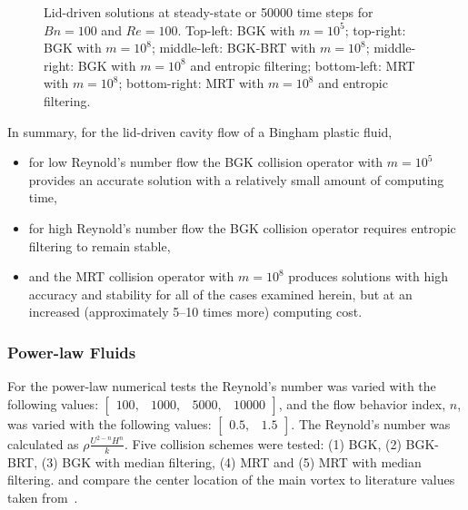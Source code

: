 \begin{figure}
\begin{tabulary}{\linewidth}{c c}
	\end{tabulary}
	\caption{Lid-driven solutions at steady-state or 50000 time steps for $Bn = 100$ and $Re = 100$. Top-left: BGK with $m = 10^5$; top-right: BGK with $m = 10^8$; middle-left: BGK-BRT with $m = 10^8$; middle-right: BGK with $m = 10^8$ and entropic filtering; bottom-left: MRT with $m = 10^8$; bottom-right: MRT with $m = 10^8$ and entropic filtering.}
	\label{fig:lid-Bn100-Re100}
\end{figure}

In summary, for the lid-driven cavity flow of a Bingham plastic fluid, 
\begin{itemize}
    \item for low Reynold's number flow the BGK collision operator with $m = 10^5$ provides an accurate solution with a relatively small amount of computing time,
    \item for high Reynold's number flow the BGK collision operator requires entropic filtering to remain stable,
    \item and the MRT collision operator with $m = 10^8$ produces solutions with high accuracy and stability for all of the cases examined herein, but at an increased (approximately 5--10 times more) computing cost.
\end{itemize} 

\subsubsection{Power-law Fluids}

For the power-law numerical tests the Reynold's number was varied with the following values: $\begin{bmatrix}100,&1000,&5000,&10000\end{bmatrix}$, and the flow behavior index, $n$, was varied with the following values: $\begin{bmatrix}0.5,&1.5\end{bmatrix}$.
The Reynold's number was calculated as $\rho \frac{U^{2-n} H^n}{k}$.
Five collision schemes were tested: (1) BGK, (2) BGK-BRT, (3) BGK with median filtering, (4) MRT and (5) MRT with median filtering.
 and  compare the center location of the main vortex to literature values taken from~\citet{li2014simulation}.

